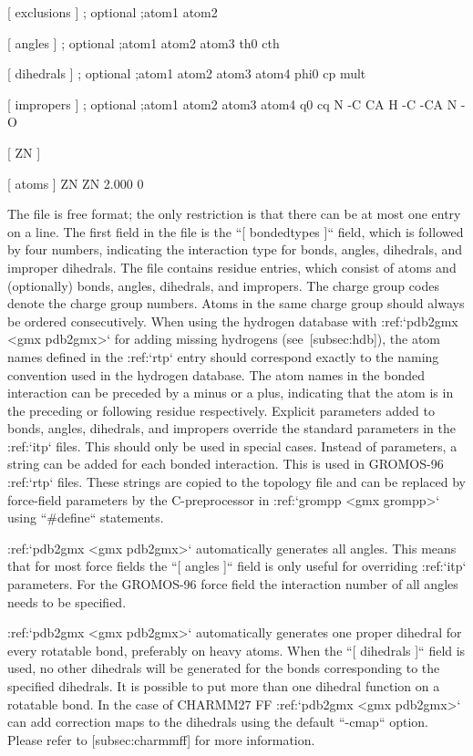      [ exclusions ]  ; optional
    ;atom1 atom2

     [ angles ]  ; optional
    ;atom1 atom2 atom3    th0    cth

     [ dihedrals ]  ; optional
    ;atom1 atom2 atom3 atom4   phi0     cp   mult

     [ impropers ]  ; optional
    ;atom1 atom2 atom3 atom4     q0     cq
         N    -C    CA     H
        -C   -CA     N    -O

    [ ZN ]

     [ atoms ]
        ZN    ZN   2.000     0

The file is free format; the only restriction is that there can be at
most one entry on a line. The first field in the file is the ``[ bondedtypes ]`` field,
which is followed by four numbers, indicating the interaction type for
bonds, angles, dihedrals, and improper dihedrals. The file contains
residue entries, which consist of atoms and (optionally) bonds, angles,
dihedrals, and impropers. The charge group codes denote the charge group
numbers. Atoms in the same charge group should always be ordered
consecutively. When using the hydrogen database with :ref:`pdb2gmx <gmx pdb2gmx>` for adding
missing hydrogens (see [subsec:hdb]), the atom names defined in the :ref:`rtp`
entry should correspond exactly to the naming convention used in the
hydrogen database. The atom names in the bonded interaction can be
preceded by a minus or a plus, indicating that the atom is in the
preceding or following residue respectively. Explicit parameters added
to bonds, angles, dihedrals, and impropers override the standard
parameters in the :ref:`itp` files. This should only be used in special cases.
Instead of parameters, a string can be added for each bonded
interaction. This is used in GROMOS-96 :ref:`rtp` files. These strings are
copied to the topology file and can be replaced by force-field
parameters by the C-preprocessor in :ref:`grompp <gmx grompp>` using ``#define`` statements.

:ref:`pdb2gmx <gmx pdb2gmx>` automatically generates all angles. This means
that for most force fields the ``[ angles ]`` field is only
useful for overriding :ref:`itp` parameters. For the GROMOS-96
force field the interaction number of all angles needs to be specified.

:ref:`pdb2gmx <gmx pdb2gmx>` automatically generates one proper dihedral for every rotatable
bond, preferably on heavy atoms. When the ``[ dihedrals ]`` field is used, no other
dihedrals will be generated for the bonds corresponding to the specified
dihedrals. It is possible to put more than one dihedral function on a
rotatable bond. In the case of CHARMM27 FF :ref:`pdb2gmx <gmx pdb2gmx>` can add correction
maps to the dihedrals using the default ``-cmap`` option. Please refer to
[subsec:charmmff] for more information.


